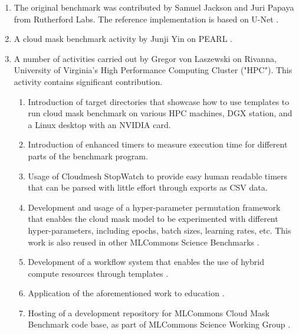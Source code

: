 \documentclass[sigplan,screen]{acmart}
\begin{document}
\begin{enumerate}
\item The original benchmark was contributed by Samuel Jackson and Juri Papaya \cite{Thiyagalingam2022AIBF,jackson-2020-eu} from Rutherford Labs.
The reference implementation is based on U-Net \cite{RFB15a}. 

\item A cloud mask benchmark activity by Junji Yin on PEARL \cite{Thiyagalingam2022AIBF}.

\item A number of activities carried out by Gregor von Laszewski on Rivanna, University of Virginia's High Performance Computing Cluster ("HPC"). This activity contains significant contribution. 

    \begin{enumerate} 

    \item Introduction of target directories that showcase how to use templates to run cloud mask benchmark on various HPC machines, DGX station, and a Linux desktop with an NVIDIA card.

    \item Introduction of enhanced timers to measure execution time for different parts of the benchmark program.

    \item Usage of Cloudmesh StopWatch to provide easy human readable timers that can be parsed with little effort through exports as CSV data.

    \item Development and usage of a hyper-parameter permutation framework that enables the cloud mask model to be experimented with different hyper-parameters, including epochs, batch sizes, learning rates, etc. This work is also reused in other MLCommons Science Benchmarks \cite{las22-cloudmesh-cc-reu}.

    \item Development of a workflow system that enables the use of hybrid compute resources through templates \cite{las-2023-escience-cloudmask}.

    \item Application of the aforementioned work to education \cite{las-2023-mlcommons-edu-eq}.

    \item Hosting of a development repository for MLCommons Cloud Mask Benchmark code base, as part of MLCommons Science Working Group \cite{github-laszewsk-mlcommons}.


\end{enumerate}
\end{enumerate}
\end{document}
